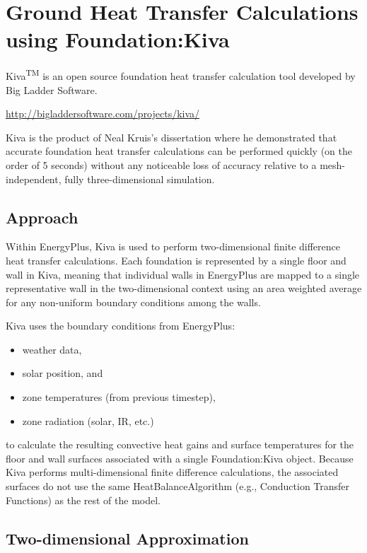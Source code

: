 \section{Ground Heat Transfer Calculations using Foundation:Kiva}

Kiva\textsuperscript{TM} is an open source foundation heat transfer
calculation tool developed by Big Ladder Software.

\url{http://bigladdersoftware.com/projects/kiva/}

Kiva is the product of Neal Kruis's dissertation where he demonstrated
that accurate foundation heat transfer calculations can be performed
quickly (on the order of 5 seconds) without any noticeable loss of
accuracy relative to a mesh-independent, fully three-dimensional
simulation.

\subsection{Approach}

Within EnergyPlus, Kiva is used to perform two-dimensional finite
difference heat transfer calculations. Each foundation is represented by
a single floor and wall in Kiva, meaning that individual walls in
EnergyPlus are mapped to a single representative wall in the
two-dimensional context using an area weighted average for any
non-uniform boundary conditions among the walls.

Kiva uses the boundary conditions from EnergyPlus:

\begin{itemize}
\tightlist
\item
  weather data,
\item
  solar position, and
\item
  zone temperatures (from previous timestep),
\item
  zone radiation (solar, IR, etc.)
\end{itemize}

to calculate the resulting convective heat gains and surface
temperatures for the floor and wall surfaces associated with a single
Foundation:Kiva object. Because Kiva performs multi-dimensional finite
difference calculations, the associated surfaces do not use the same
HeatBalanceAlgorithm (e.g., Conduction Transfer Functions) as the rest
of the model.

\subsection{Two-dimensional
Approximation}

